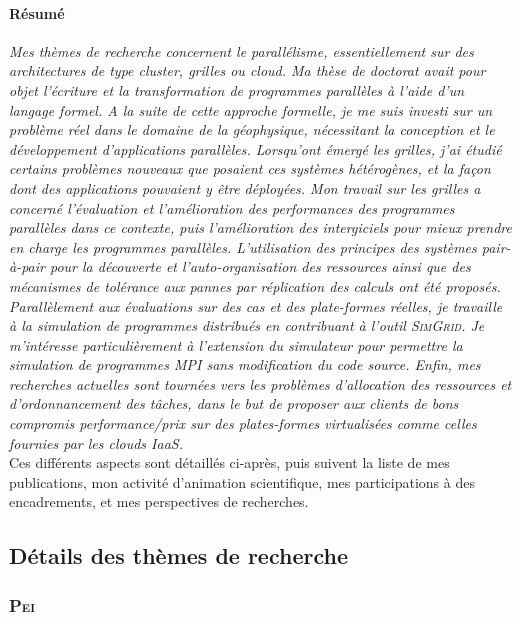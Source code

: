 \documentclass[11pt]{article}
\begin{document}
\paragraph{Résumé}
\textit{Mes thèmes de recherche concernent le \emph{parallélisme}, 
essentiellement sur des architectures de type cluster, \emph{grilles} ou 
\emph{cloud}. Ma thèse de doctorat avait pour objet l'écriture et la 
transformation de programmes parallèles à l'aide d'un langage formel. A la 
suite de cette approche formelle, je me suis investi sur un problème réel dans 
le domaine de la  géophysique, nécessitant la conception et le développement 
d'applications parallèles. Lorsqu'ont émergé les grilles, j'ai étudié certains 
problèmes nouveaux que posaient ces systèmes hétérogènes, et la façon dont des 
applications pouvaient y être déployées. Mon travail sur les grilles a concerné 
l'évaluation et l'amélioration des performances des programmes parallèles dans 
ce contexte, puis l'amélioration des intergiciels pour mieux prendre en charge 
les programmes parallèles. L'utilisation des principes des systèmes pair-à-pair 
pour la découverte et l'auto-organisation des ressources ainsi que des 
mécanismes de tolérance aux pannes par réplication des calculs ont été proposés.
Parallèlement aux évaluations sur des cas et des plate-formes réelles, je 
travaille à la simulation de programmes distribués en contribuant à l'outil 
\textsc{SimGrid}. Je m'intéresse particulièrement à l'extension du simulateur 
pour permettre la simulation de programmes MPI sans modification du code source.
Enfin, mes recherches actuelles sont tournées vers les problèmes d'allocation 
des ressources et d'ordonnancement des tâches, dans le but de proposer aux 
clients de bons compromis performance/prix sur des plates-formes virtualisées 
comme celles fournies par les clouds IaaS.}\\ 

Ces différents aspects sont détaillés ci-après, puis suivent la liste de mes 
publications, mon activité d'animation scientifique, mes participations à des 
encadrements, et mes perspectives de recherches.

\subsection{Détails des thèmes de recherche}


\subsubsection{\textsc{Pei}}
\end{document}
